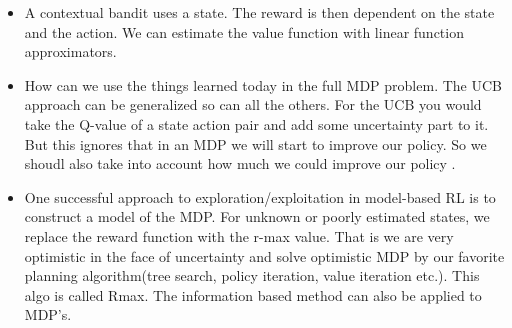 \documentclass[a4paper]{article}
\begin{document}
    \begin{itemize}
        \item A contextual bandit uses a state. The reward is then dependent on the state and the action. We can estimate the value function with linear function approximators. 
        \item How can we use the things learned today in the full MDP problem. The UCB approach can be generalized so can all the others. For the UCB you would take the Q-value of a state action pair and add some uncertainty part to it. But this ignores that in an MDP we will start to improve our policy. So we shoudl also take into account how much we could improve our policy .
        \item One successful approach to exploration/exploitation in model-based RL is to construct a model of the MDP. For unknown or poorly estimated states, we replace the reward function with the r-max value. That is we are very optimistic in the face of uncertainty and solve optimistic MDP by our favorite planning algorithm(tree search, policy iteration, value iteration etc.). This algo is called Rmax. The information based method can also be applied to MDP's. 
    \end{itemize}
    





\end{document}
